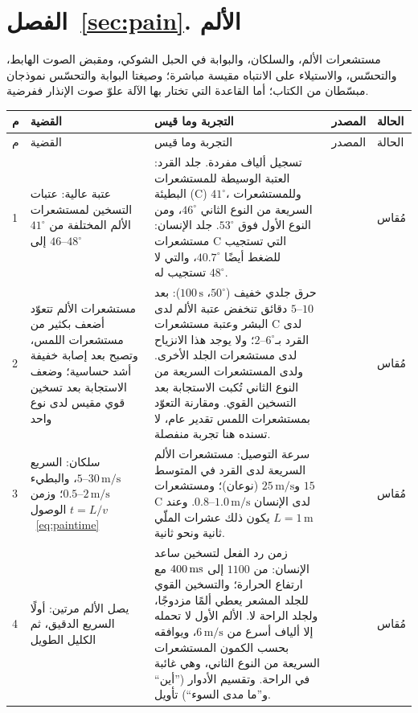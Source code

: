 \section{الفصل~\ref{sec:pain}. الألم}

مستشعرات الألم، والسلكان، والبوابة في الحبل الشوكي، ومقبض الصوت الهابط، والتحسّس، والاستيلاء على الانتباه مقيسة مباشرة؛ وصيغتا البوابة والتحسّس نموذجان مبسّطان من الكتاب؛ أما القاعدة التي تختار بها الآلة علوّ صوت الإنذار ففرضية.

{\footnotesize
\setlength{\tabcolsep}{3pt}\renewcommand{\arraystretch}{1.15}
\begin{longtable}{>{\raggedright}p{0.5cm}>{\raggedright}p{4.0cm}>{\raggedright}p{5.6cm}>{\raggedright}p{2.3cm}>{\raggedright\arraybackslash}p{1.7cm}}
\toprule
م & القضية & التجربة وما قيس & المصدر & الحالة \\
\midrule\endfirsthead
\toprule
م & القضية & التجربة وما قيس & المصدر & الحالة \\
\midrule\endhead
1 & عتبة عالية: عتبات التسخين لمستشعرات الألم المختلفة من $41^\circ$ إلى $46\text{--}48^\circ$ & تسجيل ألياف مفردة. جلد القرد: العتبة الوسيطة للمستشعرات البطيئة (\foreignlanguage{english}{C}) $41^\circ$، وللمستشعرات السريعة من النوع الثاني $46^\circ$، ومن النوع الأول فوق $53^\circ$. جلد الإنسان: مستشعرات \foreignlanguage{english}{C} التي تستجيب للضغط أيضًا $40.7^\circ$، والتي لا تستجيب له $48^\circ$. & \cite{Treede1995heat, Weidner1999cfib} & مُقاس \\
2 & مستشعرات الألم تتعوّد أضعف بكثير من مستشعرات اللمس، وتصبح بعد إصابة خفيفة أشد حساسية؛ وضعف الاستجابة بعد تسخين قوي مقيس لدى نوع واحد & حرق جلدي خفيف ($50^\circ$، $100\,\text{s}$): بعد $5\text{--}10$ دقائق تنخفض عتبة الألم لدى البشر وعتبة مستشعرات \foreignlanguage{english}{C} لدى القرد بـ$2\text{--}6^\circ$؛ ولا يوجد هذا الانزياح لدى مستشعرات الجلد الأخرى. ولدى المستشعرات السريعة من النوع الثاني تُكبت الاستجابة بعد التسخين القوي. ومقارنة التعوّد بمستشعرات اللمس تقدير عام، لا تسنده هنا تجربة منفصلة. & \cite{LaMotte1982hyper, Treede1995heat} & مُقاس \\
3 & سلكان: السريع $5\text{--}30\,\text{m/s}$، والبطيء $0.5\text{--}2\,\text{m/s}$؛ وزمن الوصول $t=L/v$~\eqref{eq:paintime} & سرعة التوصيل: مستشعرات الألم السريعة لدى القرد في المتوسط $15$ و$25\,\text{m/s}$ (نوعان)؛ ومستشعرات \foreignlanguage{english}{C} لدى الإنسان $0.8\text{--}1.0\,\text{m/s}$. وعند $L=1\,\text{m}$ يكون ذلك عشرات الملّي ثانية ونحو ثانية. & \cite{Treede1995heat, Weidner1999cfib} & مُقاس \\
4 & يصل الألم مرتين: أولًا السريع الدقيق، ثم الكليل الطويل & زمن رد الفعل لتسخين ساعد الإنسان: من $1100$ إلى $400\,\text{ms}$ مع ارتفاع الحرارة؛ والتسخين القوي للجلد المشعر يعطي ألمًا مزدوجًا، ولجلد الراحة لا. الألم الأول لا تحمله إلا ألياف أسرع من $6\,\text{m/s}$، ويوافقه بحسب الكمون المستشعرات السريعة من النوع الثاني، وهي غائبة في الراحة. وتقسيم الأدوار (”أين“ و”ما مدى السوء“) تأويل. & \cite{CampbellLaMotte1983first, Treede1995heat} & مُقاس \\

\end{longtable}}
